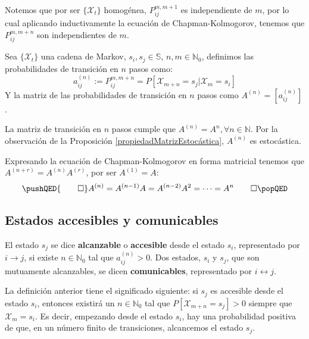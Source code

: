 Notemos que por ser $\{\mathcal{X}_t\}$ homogénea, $P_{ij}^{m,m+1}$ es independiente de $m$, por lo cual aplicando inductivamente la ecuación de Chapman-Kolmogorov, tenemos que $P_{ij}^{m,m+n}$ son independientes de $m$. 
\begin{definition}
Sea $\{\mathcal{X}_t\}$ una cadena de Markov, $s_i, s_j \in \mathbb{S}$, $n,m\in\mathbb{N}_0$,  definimos las probabilidades de transición en $n$ pasos como:
\[a_{ij}^{(n)}:=P_{ij}^{m,m+n}=P[\mathcal{X}_{m+n}=s_j|\mathcal{X}_m=s_i]\]
Y la matriz de las probabilidades de transición en $n$ pasos como $A^{(n)}=[a_{ij}^{(n)}]$.
\end{definition}
\begin{lemma}
La matriz de transición en $n$ pasos cumple que $A^{(n)}=A^n, \forall n\in\mathbb{N}$. Por la observación de la Proposición \ref{propiedadMatrizEstocástica}, $A^{(n)}$ es estocástica.
\end{lemma}
\begin{proofs*}
 Expresando la ecuación de Chapman-Kolmogorov en forma matricial tenemos que $A^{(n+r)}=A^{(n)}A^{(r)}$, por ser $A^{(1)}=A$:
    \[
    \pushQED{\qed}
    A^{(n)}=A^{(n-1)}A=A^{(n-2)}A^2=\dots=A^n \qedhere
    \popQED\]    
\end{proofs*}

\subsection{Estados accesibles y comunicables}
\begin{definition}
    El estado $s_j$ se dice \textbf{alcanzable} o \textbf{accesible} desde el estado $s_i$, representado por $i\longrightarrow j$, si existe $n\in\mathbb{N}_0$ tal que $a_{ij}^{(n)}>0$. Dos estados, $s_i$ y $s_j$, que son mutuamente alcanzables, se dicen \textbf{comunicables}, representado por $i\longleftrightarrow j$.
\end{definition}

La definición anterior tiene el significado siguiente: si $s_j$ es accesible desde el estado $s_i$, entonces existirá un $n\in\mathbb{N}_0$ tal que $P[\mathcal{X}_{m+n}=s_j]>0$ siempre que $\mathcal{X}_m=s_i$.  Es decir, empezando desde el estado $s_i$, hay una probabilidad positiva de que, en un número finito de transiciones, alcancemos el estado $s_j$.

